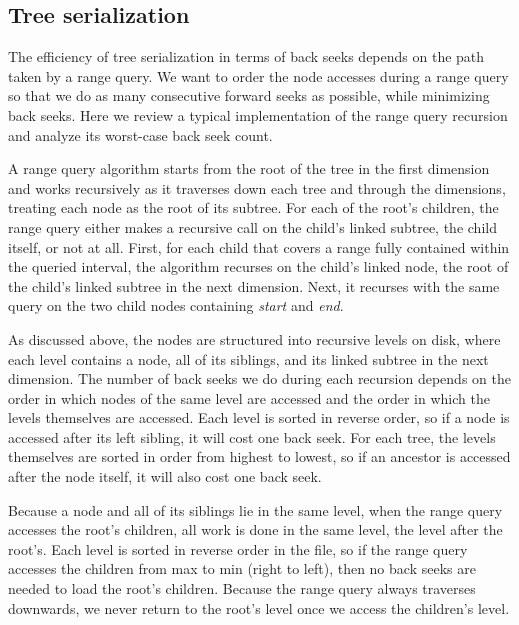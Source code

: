 \documentclass[11pt, oneside]{article}
\newcommand{\ms}{\textit}
\begin{document}

\subsection{Tree serialization}

The efficiency of tree serialization in terms of back seeks depends on the path
taken by a range query. We want to order the node accesses during a range query
so that we do as many consecutive forward seeks as possible, while minimizing
back seeks. Here we review a typical implementation of the range query
recursion and analyze its worst-case back seek count. 


A range query algorithm starts from the root of the tree in the first dimension
and works recursively as it traverses down each tree and through the
dimensions, treating each node as the root of its subtree. For each of the
root's children, the range query either makes a recursive call on the child's
linked subtree, the child itself, or not at all. First, for each child that
covers a range fully contained within the queried interval, the algorithm
recurses on the child's linked node, the root of the child's linked subtree in
the next dimension. Next, it recurses with the same query on the two child
nodes containing \ms{start} and \ms{end}. 

As discussed above, the nodes are structured into recursive levels on disk,
where each level contains a node, all of its siblings, and its linked subtree
in the next dimension. The number of back seeks we do during each recursion
depends on the order in which nodes of the same level are accessed and the
order in which the levels themselves are accessed. Each level is sorted in
reverse order, so if a node is accessed after its left sibling, it will cost
one back seek. For each tree, the levels themselves are sorted in order from
highest to lowest, so if an ancestor is accessed after the node itself, it will
also cost one back seek. 

Because a node and all of its siblings lie in the same level, when the range
query accesses the root's children, all work is done in the same level, the
level after the root's. Each level is sorted in reverse order in the file, so
if the range query accesses the children from max to min (right to left), then
no back seeks are needed to load the root's children. Because the range query
always traverses downwards, we never return to the root's level once we access
the children's level.
\end{document}

